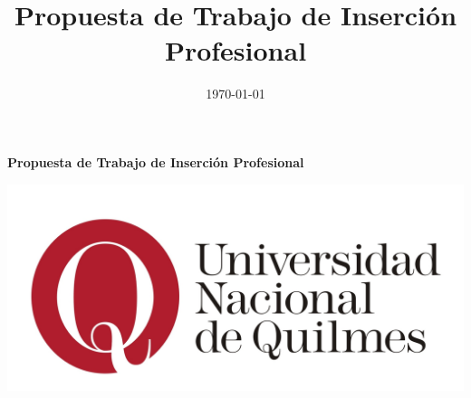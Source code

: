\documentclass[journal]{IEEEtran}
\title{Propuesta de Trabajo de Inserción Profesional}
\date{\today}
\begin{document}
\begin{titlepage}

\newcommand{\HRule}{\rule{\linewidth}{0.5mm}} %

\center %




{ \huge \bfseries Propuesta de Trabajo de Inserción Profesional}\\[0.4cm] %

\bigskip
\bigskip
\bigskip
\bigskip
\bigskip
\bigskip
 


\bigskip
\bigskip
\bigskip

\includegraphics[width=\textwidth,height=\textheight,keepaspectratio]{assets/logo-unq.jpg}\\[1cm]

\end{titlepage}

\maketitle



\break
\printbibliography
\end{document}
